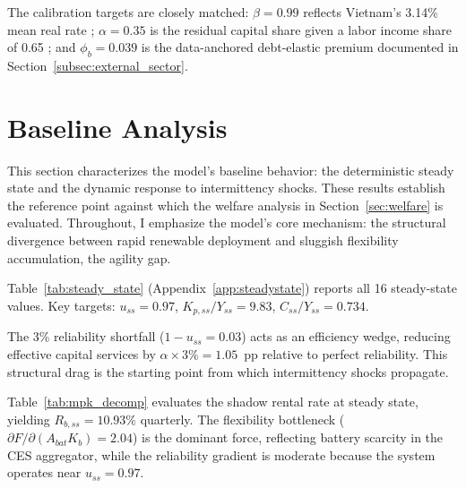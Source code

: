 	The calibration targets are closely matched: $\beta = 0.99$ reflects Vietnam's 3.14\% mean real rate \citep{worldbank2024}; $\alpha = 0.35$ is the residual capital share given a labor income share of 0.65 \citep{gso2024}; and $\phi_b = 0.039$ is the data-anchored debt-elastic premium documented in Section~\ref{subsec:external_sector}.
	
	\section{Baseline Analysis} \label{sec:results}
	
	This section characterizes the model's baseline behavior: the deterministic steady state and the dynamic response to intermittency shocks. These results establish the reference point against which the welfare analysis in Section~\ref{sec:welfare} is evaluated. Throughout, I emphasize the model's core mechanism: the structural divergence between rapid renewable deployment and sluggish flexibility accumulation, the agility gap.
	
	Table~\ref{tab:steady_state} (Appendix~\ref{app:steadystate}) reports all 16 steady-state values. Key targets: $u_{ss}=0.97$, $K_{p,ss}/Y_{ss}=9.83$, $C_{ss}/Y_{ss}=0.734$.

  	The 3\% reliability shortfall ($1-u_{ss}=0.03$) acts as an efficiency wedge, reducing effective capital services by $\alpha \times 3\% = 1.05$~pp relative to perfect reliability. This structural drag is the starting point from which intermittency shocks propagate.

	Table~\ref{tab:mpk_decomp} evaluates the shadow rental rate at steady state, yielding $R_{b,ss} = 10.93\%$ quarterly. The flexibility bottleneck ($\partial F / \partial(A_{bat} K_b) = 2.04$) is the dominant force, reflecting battery scarcity in the CES aggregator, while the reliability gradient is moderate because the system operates near $u_{ss} = 0.97$.
	
